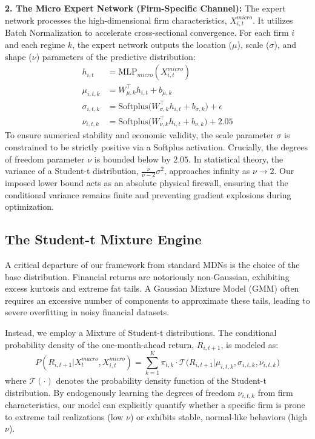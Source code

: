 \documentclass[12pt]{article}
\begin{document}
\textbf{2. The Micro Expert Network (Firm-Specific Channel):}
The expert network processes the high-dimensional firm characteristics, $X_{i,t}^{micro}$. It utilizes Batch Normalization to accelerate cross-sectional convergence. For each firm $i$ and each regime $k$, the expert network outputs the location ($\mu$), scale ($\sigma$), and shape ($\nu$) parameters of the predictive distribution:
\begin{align}
    h_{i,t} &= \text{MLP}_{micro}(X_{i,t}^{micro}) \\
    \mu_{i,t,k} &= W_{\mu, k}^\top h_{i,t} + b_{\mu, k} \\
    \sigma_{i,t,k} &= \text{Softplus}\Big( W_{\sigma, k}^\top h_{i,t} + b_{\sigma, k} \Big) + \epsilon \\
    \nu_{i,t,k} &= \text{Softplus}\Big( W_{\nu, k}^\top h_{i,t} + b_{\nu, k} \Big) + 2.05 
\end{align}
To ensure numerical stability and economic validity, the scale parameter $\sigma$ is constrained to be strictly positive via a Softplus activation. Crucially, the degrees of freedom parameter $\nu$ is bounded below by $2.05$. In statistical theory, the variance of a Student-t distribution, $\frac{\nu}{\nu - 2}\sigma^2$, approaches infinity as $\nu \to 2$. Our imposed lower bound acts as an absolute physical firewall, ensuring that the conditional variance remains finite and preventing gradient explosions during optimization.

\subsection{The Student-t Mixture Engine}
\label{subsec:student_t}

A critical departure of our framework from standard MDNs is the choice of the base distribution. Financial returns are notoriously non-Gaussian, exhibiting excess kurtosis and extreme fat tails. A Gaussian Mixture Model (GMM) often requires an excessive number of components to approximate these tails, leading to severe overfitting in noisy financial datasets. 

Instead, we employ a Mixture of Student-t distributions. The conditional probability density of the one-month-ahead return, $R_{i,t+1}$, is modeled as:
\begin{equation}
    P(R_{i,t+1} | X_{t}^{macro}, X_{i,t}^{micro}) = \sum_{k=1}^{K} \pi_{t,k} \cdot \mathcal{T} \Big( R_{i,t+1} \Big| \mu_{i,t,k}, \sigma_{i,t,k}, \nu_{i,t,k} \Big)
\end{equation}
where $\mathcal{T}(\cdot)$ denotes the probability density function of the Student-t distribution. By endogenously learning the degrees of freedom $\nu_{i,t,k}$ from firm characteristics, our model can explicitly quantify whether a specific firm is prone to extreme tail realizations (low $\nu$) or exhibits stable, normal-like behaviors (high $\nu$).
\end{document}
